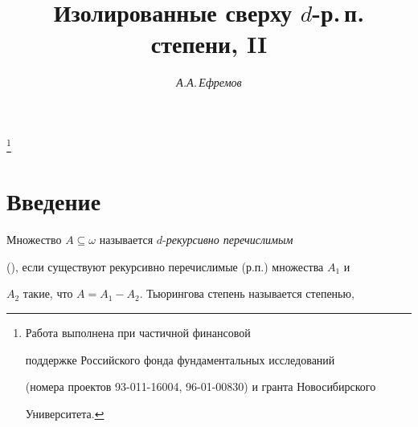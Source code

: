 







\author{\it А.А.\,Ефремов}




\title{Изолированные сверху $d$-р.\,п. степени, II}





\thanks{Работа выполнена при частичной финансовой


поддержке Российского фонда фундаментальных исследований 


(номера проектов 93-011-16004, 96-01-00830) и гранта Новосибирского


Университета.}


\date{}







\pagestyle{plain} %













\maketitle


\label{begin}





\section{Введение}





Множество $A\subseteq\omega$ называется $d$-{\it рекурсивно перечислимым}


(\re), если существуют рекурсивно перечислимые (р.п.) множества $A_1$ и


$A_2$ такие, что $A=A_1-A_2$. Тьюрингова степень называется \re{} степенью,



